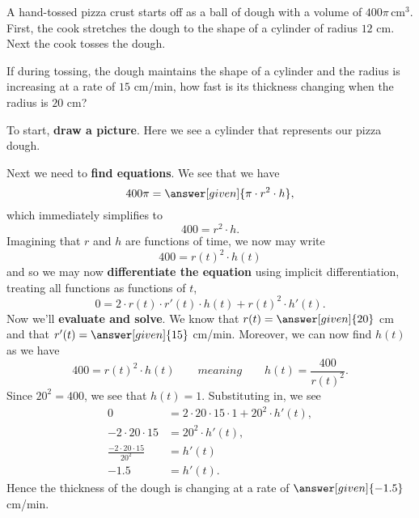 \documentclass{ximera}
\begin{document}
\begin{example}
A hand-tossed pizza crust starts off as a ball of dough with a volume
of $400\pi\, \text{cm}^3$. First, the cook stretches the dough to the
shape of a cylinder of radius $12$ cm. Next the cook tosses the
dough.

If during tossing, the dough maintains the shape of a cylinder and the
radius is increasing at a rate of $15$ cm/min, how fast is its
thickness changing when the radius is $20$ cm?
\begin{explanation}
  To start, \textbf{draw a picture}. Here we see a cylinder that
  represents our pizza dough.
  \begin{image}
  \end{image}
  Next we need to \textbf{find equations}. We see that we have
  \[
  400\pi = \answer[given]{\pi \cdot r^2 \cdot h},
  \]
  which immediately simplifies to
  \[
  400 = r^2 \cdot h.
  \]
  Imagining that $r$ and $h$ are functions of time, we now may write
  \[
  400 = r(t)^2 \cdot h(t)
  \]
  and so we may now \textbf{differentiate the equation} using implicit
  differentiation, treating all functions as functions of $t$,
  \[
  0 = 2\cdot r(t) \cdot r'(t) \cdot h(t) + r(t)^2 \cdot h'(t).
  \]
  Now we'll \textbf{evaluate and solve}. We know that $r(t) =
  \answer[given]{20}$ cm and that $r'(t) = \answer[given]{15}$
  cm/min. Moreover, we can now find $h(t)$ as we have
  \[
  400 = r(t)^2 \cdot h(t) \qquad{meaning}\qquad h(t) = \frac{400}{r(t)^2}.
  \]
  Since $20^2 = 400$, we see that $h(t) = 1$. Substituting in, we see
  \begin{align*}
    0 &= 2\cdot 20 \cdot 15 \cdot 1 + 20^2 \cdot h'(t),\\
    -2\cdot 20 \cdot 15  &= 20^2 \cdot h'(t),\\
    \frac{-2\cdot 20 \cdot 15}{20^2}  &= h'(t)\\
    -1.5  &= h'(t).
  \end{align*}
  Hence the thickness of the dough is changing at a rate of $\answer[given]{-1.5}$
  cm/min.
\end{explanation}
\end{example}
\end{document}
